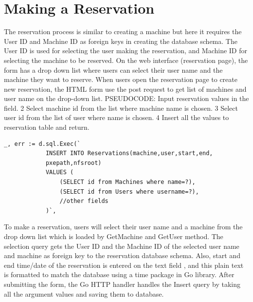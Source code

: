 \section*{Making a Reservation}
The reservation process is similar to creating a machine but here it requires the User ID and Machine ID as foreign keys in creating the database schema. The User ID is used for selecting the user making the reservation, and Machine ID for selecting the machine to be reserved. On the web interface (reservation page), the form has a drop down list where users can select their user name and the machine they want to reserve. When users open the reservation page to create new reservation, the HTML form use the post request to get list of machines and user name on the drop-down list.
PSEUDOCODE: Input reservation values in the field.
2 Select machine id from the list where machine name is chosen.
3 Select user id from the list of user where name is chosen.
4 Insert all the values to reservation table and return.
\begin{lstlisting}[caption=Storing Reservation details, label=Adding reservation]
	_, err := d.sql.Exec(`
			INSERT INTO Reservations(machine,user,start,end,
			pxepath,nfsroot)
			VALUES (
				(SELECT id from Machines where name=?),
				(SELECT id from Users where username=?),
				//other fields
			)`,
\end{lstlisting}

To make a reservation, users will select their user name and a machine from the drop down list which is loaded by GetMachine and GetUser method. The selection query gets the User ID and the Machine ID of the selected user name and machine as foreign key to the reservation database schema. Also, start and end time/date of the reservation is entered on the text field , and this plain text is formatted to match the database using a time package in Go library. After submitting the form, the Go HTTP handler handles the Insert query by taking all the argument values and saving them to database. 
